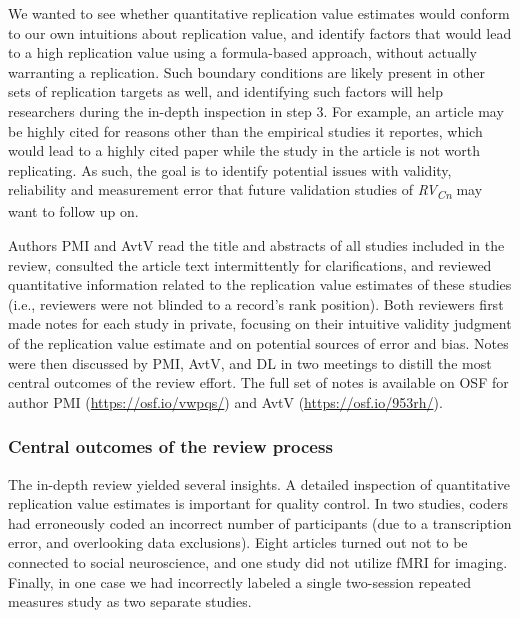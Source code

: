 \documentclass[
  man,floatsintext]{apa6}
\begin{document}
We wanted to see whether quantitative replication value estimates would conform to our own intuitions about replication value, and identify factors that would lead to a high replication value using a formula-based approach, without actually warranting a replication. Such boundary conditions are likely present in other sets of replication targets as well, and identifying such factors will help researchers during the in-depth inspection in step 3. For example, an article may be highly cited for reasons other than the empirical studies it reportes, which would lead to a highly cited paper while the study in the article is not worth replicating. As such, the goal is to identify potential issues with validity, reliability and measurement error that future validation studies of \emph{RV\textsubscript{Cn}} may want to follow up on.

Authors PMI and AvtV read the title and abstracts of all studies included in the review, consulted the article text intermittently for clarifications, and reviewed quantitative information related to the replication value estimates of these studies (i.e., reviewers were not blinded to a record's rank position). Both reviewers first made notes for each study in private, focusing on their intuitive validity judgment of the replication value estimate and on potential sources of error and bias. Notes were then discussed by PMI, AvtV, and DL in two meetings to distill the most central outcomes of the review effort. The full set of notes is available on OSF for author PMI (\url{https://osf.io/vwpqs/}) and AvtV (\url{https://osf.io/953rh/}).

\hypertarget{central-outcomes-of-the-review-process}{%
\subsubsection{Central outcomes of the review process}\label{central-outcomes-of-the-review-process}}

The in-depth review yielded several insights. A detailed inspection of quantitative replication value estimates is important for quality control. In two studies, coders had erroneously coded an incorrect number of participants (due to a transcription error, and overlooking data exclusions). Eight articles turned out not to be connected to social neuroscience, and one study did not utilize fMRI for imaging. Finally, in one case we had incorrectly labeled a single two-session repeated measures study as two separate studies.
\end{document}
